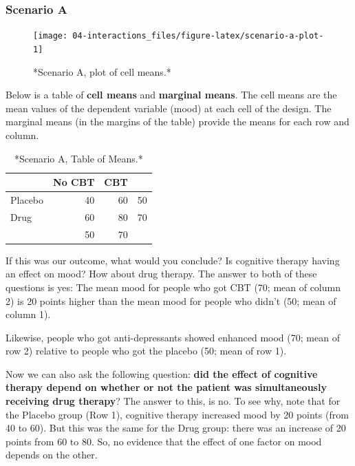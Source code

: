 \documentclass[]{book}
\begin{document}
\hypertarget{scenario-a}{%
\subsubsection*{Scenario A}\label{scenario-a}}

\begin{figure}

{\centering \texttt{[image: 04-interactions\_files/figure-latex/scenario-a-plot-1]} 

}

\caption{*Scenario A, plot of cell means.*}\label{fig:scenario-a-plot}
\end{figure}

Below is a table of \textbf{cell means} and \textbf{marginal means}. The cell means are the mean values of the dependent variable (mood) at each cell of the design. The marginal means (in the margins of the table) provide the means for each row and column.

\begin{table}

\caption{\label{tab:scenario-a-means}*Scenario A, Table of Means.*}
\centering
\begin{tabular}[t]{l|r|r|l}
\hline
  & No CBT & CBT &   \\
\hline
Placebo & 40 & 60 & 50\\
\hline
Drug & 60 & 80 & 70\\
\hline
 & 50 & 70 & \\
\hline
\end{tabular}
\end{table}

If this was our outcome, what would you conclude? Is cognitive therapy having an effect on mood? How about drug therapy. The answer to both of these questions is yes: The mean mood for people who got CBT (70; mean of column 2) is 20 points higher than the mean mood for people who didn't (50; mean of column 1).

Likewise, people who got anti-depressants showed enhanced mood (70; mean of row 2) relative to people who got the placebo (50; mean of row 1).

Now we can also ask the following question: \textbf{did the effect of cognitive therapy depend on whether or not the patient was simultaneously receiving drug therapy}? The answer to this, is no. To see why, note that for the Placebo group (Row 1), cognitive therapy increased mood by 20 points (from 40 to 60). But this was the same for the Drug group: there was an increase of 20 points from 60 to 80. So, no evidence that the effect of one factor on mood depends on the other.
\end{document}
